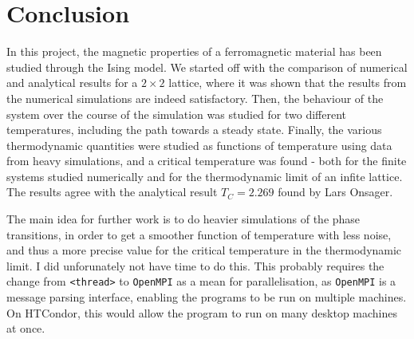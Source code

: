 \documentclass[12pt,english,a4paper]{article}
\begin{document}
\clearpage
\section{Conclusion}
In this project, the magnetic properties of a ferromagnetic material has been studied through the Ising model. We started off with the comparison of numerical and analytical results for a \(2\times2\) lattice, where it was shown that the results from the numerical simulations are indeed satisfactory. Then, the behaviour of the system over the course of the simulation was studied for two different temperatures, including the path towards a steady state. Finally, the various thermodynamic quantities were studied as functions of temperature using data from heavy simulations, and a critical temperature was found - both for the finite systems studied numerically and for the thermodynamic limit of an infite lattice. The results agree with the analytical result \(T_C=\num{2.269}\) found by Lars Onsager.

The main idea for further work is to do heavier simulations of the phase transitions, in order to get a smoother function of temperature with less noise, and thus a more precise value for the critical temperature in the thermodynamic limit. I did unforunately not have time to do this. This probably requires the change from \texttt{<thread>} to \texttt{OpenMPI} as a mean for parallelisation, as \texttt{OpenMPI} is a message parsing interface, enabling the programs to be run on multiple machines. On HTCondor, this would allow the program to run on many desktop machines at once.


\clearpage
{}
\printbibliography
\end{document}

